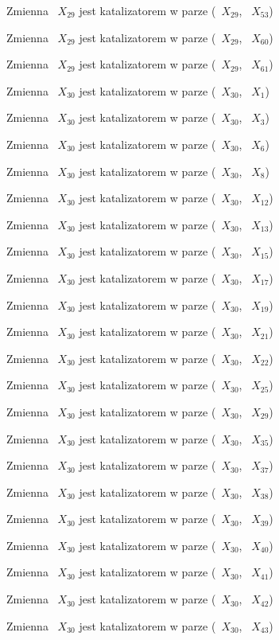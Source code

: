 \documentclass{article}
\begin{document}
Zmienna ~$X_{29}$ jest katalizatorem w parze (~$X_{29}$, ~$X_{53}$)

Zmienna ~$X_{29}$ jest katalizatorem w parze (~$X_{29}$, ~$X_{60}$)

Zmienna ~$X_{29}$ jest katalizatorem w parze (~$X_{29}$, ~$X_{61}$)

Zmienna ~$X_{30}$ jest katalizatorem w parze (~$X_{30}$, ~$X_{1}$)

Zmienna ~$X_{30}$ jest katalizatorem w parze (~$X_{30}$, ~$X_{3}$)

Zmienna ~$X_{30}$ jest katalizatorem w parze (~$X_{30}$, ~$X_{6}$)

Zmienna ~$X_{30}$ jest katalizatorem w parze (~$X_{30}$, ~$X_{8}$)

Zmienna ~$X_{30}$ jest katalizatorem w parze (~$X_{30}$, ~$X_{12}$)

Zmienna ~$X_{30}$ jest katalizatorem w parze (~$X_{30}$, ~$X_{13}$)

Zmienna ~$X_{30}$ jest katalizatorem w parze (~$X_{30}$, ~$X_{15}$)

Zmienna ~$X_{30}$ jest katalizatorem w parze (~$X_{30}$, ~$X_{17}$)

Zmienna ~$X_{30}$ jest katalizatorem w parze (~$X_{30}$, ~$X_{19}$)

Zmienna ~$X_{30}$ jest katalizatorem w parze (~$X_{30}$, ~$X_{21}$)

Zmienna ~$X_{30}$ jest katalizatorem w parze (~$X_{30}$, ~$X_{22}$)

Zmienna ~$X_{30}$ jest katalizatorem w parze (~$X_{30}$, ~$X_{25}$)

Zmienna ~$X_{30}$ jest katalizatorem w parze (~$X_{30}$, ~$X_{29}$)

Zmienna ~$X_{30}$ jest katalizatorem w parze (~$X_{30}$, ~$X_{35}$)

Zmienna ~$X_{30}$ jest katalizatorem w parze (~$X_{30}$, ~$X_{37}$)

Zmienna ~$X_{30}$ jest katalizatorem w parze (~$X_{30}$, ~$X_{38}$)

Zmienna ~$X_{30}$ jest katalizatorem w parze (~$X_{30}$, ~$X_{39}$)

Zmienna ~$X_{30}$ jest katalizatorem w parze (~$X_{30}$, ~$X_{40}$)

Zmienna ~$X_{30}$ jest katalizatorem w parze (~$X_{30}$, ~$X_{41}$)

Zmienna ~$X_{30}$ jest katalizatorem w parze (~$X_{30}$, ~$X_{42}$)

Zmienna ~$X_{30}$ jest katalizatorem w parze (~$X_{30}$, ~$X_{43}$)
\end{document}
